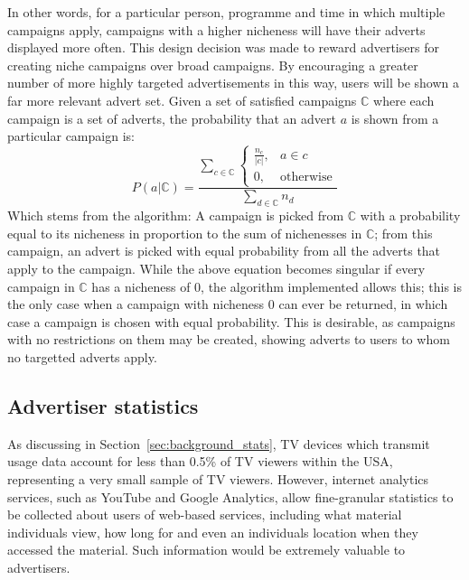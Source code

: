 	In other words, for a particular person, programme and time in which multiple campaigns apply, campaigns with a higher nicheness will have their adverts displayed more often. This design decision was made to reward advertisers for creating niche campaigns over broad campaigns. By encouraging a greater number of more highly targeted advertisements in this way, users will be shown a far more relevant advert set. Given a set of satisfied campaigns $\mathbb{C}$ where each campaign is a set of adverts, the probability that an advert $a$ is shown from a particular campaign is:
	$$
		P(a|\mathbb{C}) =
		\frac{
			\displaystyle \sum_{c \in \mathbb{C}}
			\begin{cases}
				\frac{n_c}{\left|c\right|}, & a \in c \\
				0, & \text{otherwise}
			\end{cases}
		}{
			\displaystyle \sum_{d \in \mathbb{C}} n_d
		}
	$$
Which stems from the algorithm: A campaign is picked from $\mathbb{C}$ with a probability equal to its nicheness in proportion to the sum of nichenesses in $\mathbb{C}$; from this campaign, an advert is picked with equal probability from all the adverts that apply to the campaign. While the above equation becomes singular if every campaign in $\mathbb{C}$ has a nicheness of 0, the algorithm implemented allows this; this is the only case when a campaign with nicheness 0 can ever be returned, in which case a campaign is chosen with equal probability. This is desirable, as campaigns with no restrictions on them may be created, showing adverts to users to whom no targetted adverts apply.

\subsection{Advertiser statistics}

	As discussing in Section~\ref{sec:background_stats}, TV devices which transmit usage data account for less than 0.5\% of TV viewers within the USA, representing a very small sample of TV viewers. However, internet analytics services, such as YouTube and Google Analytics, allow fine-granular statistics to be collected about users of web-based services, including what material individuals view, how long for and even an individuals location when they accessed the material. Such information would be extremely valuable to advertisers.

